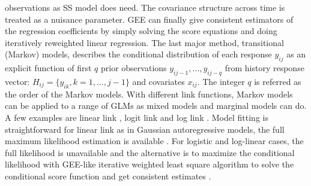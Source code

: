 \documentclass[12pt]{article}
\begin{document}
observations as SS model does need. The covariance structure across time is treated as a nuisance parameter. GEE can finally give consistent estimators of the regression coefficients by simply solving the score equations and doing iteratively reweighted linear regression. The last major method, transitional (Markov) models, describes the conditional distribution of each response $y_{ij}$ as an explicit function of first $q$ prior observations $y_{ij-1},\dots,y_{ij-q}$ from history response vector: $H_{ij} = \{ y_{ik}, k = 1,\dots,j - 1\}$ and covariates $x_{ij}$. The integer $q$ is referred as the order of the Markov models. With different link functions, Markov models can be applied to a range of GLMs as mixed models and marginal models can do. A few examples are linear link \cite{tsay1984regression}, logit link \cite{cox1989analysis,zeger1985analysis,korn1979methods} and log link \cite{zeger1988markov}. Model fitting is straightforward for linear link as in Gaussian autoregressive models, the full maximum likelihood estimation is available \cite{tsay1984regression}. For logistic and log-linear cases, the full likelihood is unavailable and the alternative is to maximize the conditional likelihood with GEE-like iterative weighted least square algorithm to solve the conditional score function and get consistent estimates \cite{cox1989analysis,zeger1985analysis,korn1979methods,zeger1988markov}.
\end{document}
